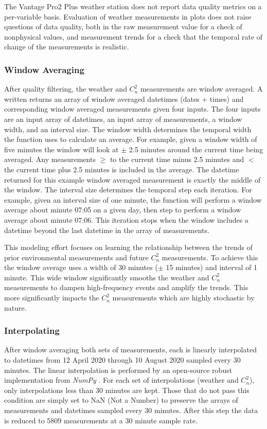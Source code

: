 The Vantage Pro2 Plus weather station does not report data quality metrics on a per-variable basis. Evaluation of weather measurements in plots does not raise questions of data quality, both in the raw measurement value for a check of nonphysical values, and measurement trends for a check that the temporal rate of change of the measurements is realistic.

\subsubsection{Window Averaging}
After quality filtering, the weather and $C_{n}^{2}$ measurements are window averaged. A written returns an array of window averaged datetimes (dates + times) and corresponding window averaged measurements given four inputs. The four inputs are an input array of datetimes, an input array of measurements, a window width, and an interval size. The window width determines the temporal width the function uses to calculate an average. For example, given a window width of five minutes the window will look at $\pm$ 2.5 minutes around the current time being averaged. Any measurements $\ge$ to the current time minus 2.5 minutes and $<$ the current time plus 2.5 minutes is included in the average. The datetime returned for this example window averaged measurement is exactly the middle of the window. The interval size determines the temporal step each iteration. For example, given an interval size of one minute, the function will perform a window average about minute 07:05 on a given day, then step to perform a window average about minute 07:06. This iteration stops when the window includes a datetime beyond the last datetime in the array of measurements.

This modeling effort focuses on learning the relationship between the trends of prior environmental measurements and future $C_{n}^{2}$ measurements. To achieve this the window average uses a width of 30 minutes ($\pm$ 15 minutes) and interval of 1 minute. This wide window significantly smooths the weather and $C_{n}^{2}$ measurements to dampen high-frequency events and amplify the trends. This more significantly impacts the $C_{n}^{2}$ measurements which are highly stochastic by nature. 

\subsubsection{Interpolating}
After window averaging both sets of measurements, each is linearly interpolated to datetimes from 12 April 2020 through 10 August 2020 sampled every 30 minutes. The linear interpolation is performed by an open-source robust implementation from \textit{NumPy} \cite{harris2020array}. For each set of interpolations (weather and $C_{n}^{2}$), only interpolations less than 30 minutes are kept. Those that do not pass this condition are simply set to NaN (Not a Number) to preserve the arrays of measurements and datetimes sampled every 30 minutes. After this step the data is reduced to 5809 measurements at a 30 minute sample rate.

